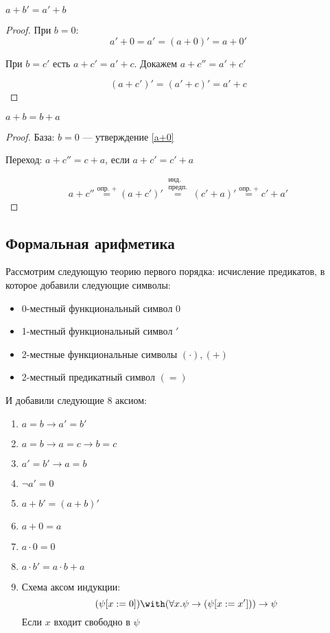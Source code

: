 \begin{statement}
    \(a + b' = a' + b\)
\end{statement}

\begin{proof}
    При \(b = 0\):
    \[a' + 0 = a' = (a + 0)' = a + 0'\]

    При \(b = c'\) есть \(a + c' = a' + c\). Докажем \(a + c'' = a' + c'\)

    \[(a + c')' = (a' + c)' = a' + c\]
\end{proof}

\begin{statement}
    \(a + b = b + a\)
\end{statement}

\begin{proof}
    База: \(b = 0\) --- утверждение \ref{a+0}

    Переход: \(a + c'' = c + a\), если \(a + c' = c' + a\)

    \[a + c'' \stackrel{\text{опр. }+}{= } (a + c')' \stackrel{\substack{\text{инд.}\\\text{предп.}}}{=} (c' + a)' \stackrel{\text{опр. }+}{= } c' + a'\]
\end{proof}

\subsection{Формальная арифметика}

Рассмотрим следующую теорию первого порядка: исчисление предикатов, в которое добавили следующие символы:
\begin{itemize}
    \item 0-местный функциональный символ \(0\)
    \item 1-местный функциональный символ \('\)
    \item 2-местные функциональные символы \((\cdot), ( +)\)
    \item 2-местный предикатный символ \((=)\)
\end{itemize}

И добавили следующие 8 аксиом:
\begin{enumerate}
    \item \(a = b \to a' = b'\)
    \item \(a = b \to a = c \to b = c\)
    \item \(a' = b' \to a = b\)
    \item \(\neg a' = 0\)
    \item \(a + b' = (a + b)'\)
    \item \(a + 0 = a\)
    \item \(a \cdot 0 = 0\)
    \item \(a \cdot b' = a \cdot b + a\)
    \item Схема аксом индукции:
          \[(\psi[x: = 0]) \with (\forall x.\psi \to (\psi[x: = x'])) \to \psi\]
          Если \(x\) входит свободно в \(\psi\)
\end{enumerate}

